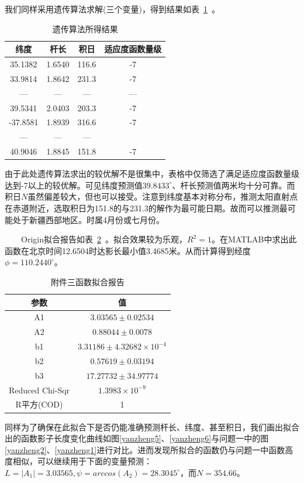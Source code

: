 \documentclass[12pt]{cumcmart}   %
\begin{document}
我们同样采用遗传算法求解(三个变量)，得到结果如表~\ref{answer2}~。

\begin{table}[H]
	\centering
	\caption{遗传算法所得结果}\label{answer2}
	\begin{tabular}{cccc}
		\toprule[1.5pt]
		纬度& 杆长&积日&适应度函数量级 \\
		\midrule[1pt]
		35.1382 &   1.6540 &  116.6 &-7\\
		33.9814 &  1.8642  &  231.3&-7\\
	---&   ---  & ---  &---\\
	39.5341  & 2.0403 & 203.3 & -7\\
	-37.8581  & 1.8939  &316.6  & -7\\
		--- &   ---   &  ---\\

		40.9046  & 1.8845 &151.8  & -7\\
		\bottomrule[1.5pt]
	\end{tabular}
\end{table}
由于此处遗传算法求出的较优解不是很集中，表格中仅筛选了满足适应度函数量级达到-7以上的较优解。可见纬度预测值$39.8433^\circ$、杆长预测值两米均十分可靠。而积日$N$虽然偏差较大，但也可以接受。注意到纬度基本对称分布，推测太阳直射点在赤道附近，选取积日为151.8的与231.3的解作为最可能日期。故而可以推测最可能处于新疆西部地区。时属4月份或七月份。




$\qquad$Origin拟合报告如表~\ref{baogao3}~。拟合效果较为乐观，$R^2=1$。在MATLAB中求出此函数在北京时间12.6504时达影长最小值3.4685米。从而计算得到经度$\phi=110.2440^\circ$。
\begin{table}[!htbp]
	\centering
	\caption{附件三函数拟合报告}\label{baogao3}
	\begin{tabular}{cc}
		\toprule[1.5pt]
		参数& 值 \\
		\midrule[1pt]
		A1	&$3.03565\pm 0.02534$\\
		A2	&$0.88044 \pm 0.0078$\\
		b1	&$3.31186\pm 4.32682\times 10^{-4}$\\
		b2  &$0.57619 \pm0.03194$\\
		b3  &$17.27732 \pm 34.97774$\\
		Reduced Chi-Sqr &$1.3983\times10^{-9}$\\
		R平方(COD)&	1\\
		\bottomrule[1.5pt]
	\end{tabular}
\end{table}
同样为了确保在此拟合下是否仍能准确预测杆长、纬度、甚至积日，我们画出拟合出的函数影子长度变化曲线如图\ref{yanzheng5}、\ref{yanzheng6}与问题一中的图\ref{yanzheng2}、\ref{yanzheng1}进行对比。进而发现所拟合的函数仍与问题一中函数高度相似，可以继续用于下面的变量预测：
$L=|A_1|=3.03565,\psi=arccos(A_2)= 28.3045^\circ$，而$N=354.66$。
\end{document}
